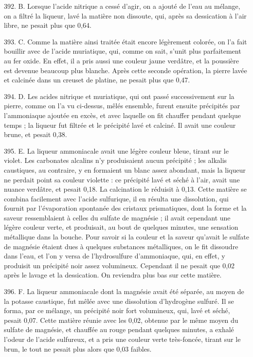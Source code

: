 \documentclass[a4paper, 11pt, oneside, polutonikogreek, french]{article}
\begin{document}
392. B. Lorsque l'acide nitrique a cessé d'agir, on a ajouté de l'eau au mélange, on a filtré la liqueur, lavé la matière non dissoute, qui, après sa dessication à l'air libre, ne pesait plus que 0,64.

393. C. Comme la matière ainsi traitée était encore légèrement colorée, on l'a fait bouillir avec de l'acide muriatique, qui, comme on sait, s'unit plus parfaitement au fer oxide. En effet, il a pris aussi une couleur jaune verdâtre, et la poussière est devenue beaucoup plus blanche. Après cette seconde opération, la pierre lavée et calcinée dans un creuset de platine, ne pesait plus que 0,47.

394. D. Les acides nitrique et muriatique, qui ont passé successivement sur la pierre, comme on l'a vu ci-dessus, mêlés ensemble, furent ensuite précipités par l'ammoniaque ajoutée en excès, et avec laquelle on fit chauffer pendant quelque temps ; la liqueur fut filtrée et le précipité lavé et calciné. Il avait une couleur brune, et pesait 0,38.

395. E. La liqueur ammoniacale avait une légère couleur bleue, tirant sur le violet. Les carbonates alcalins n'y produisaient aucun précipité ; les alkalis caustiques, au contraire, y en formaient un blanc assez abondant, mais la liqueur ne perdait point sa couleur violette : ce précipité lavé et séché à l'air, avait une nuance verdâtre, et pesait 0,18. La calcination le réduisit à 0,13. Cette matière se combina facilement avec l'acide sulfurique, il en résulta une dissolution, qui fournit par l'évaporation spontanée des cristaux prismatiques, dont la forme et la saveur ressemblaient à celles du sulfate de magnésie ; il avait cependant une légère couleur verte, et produisait, au bout de quelques minutes, une sensation métallique dans la bouche. Pour savoir si la couleur et la saveur qu'avait le sulfate de magnésie étaient dues à quelques substances métalliques, on le fit dissoudre dans l'eau, et l'on y versa de l'hydrosulfure d'ammoniaque, qui, en effet, y produisit un précipité noir assez volumineux. Cependant il ne pesait que 0,02 après le lavage et la dessication. On reviendra plus bas sur cette matière.

396. F. La liqueur ammoniacale dont la magnésie avait été séparée, au moyen de la potasse caustique, fut mêlée avec une dissolution d'hydrogène sulfuré. Il se forma, par ce mélange, un précipité noir fort volumineux, qui, lavé et séché, pesait 0,07. Cette matière réunie avec les 0,02, obtenue par le même moyen du sulfate de magnésie, et chauffée au rouge pendant quelques minutes, a exhalé l'odeur de l'acide sulfureux, et a pris une couleur verte très-foncée, tirant sur le brun, le tout ne pesait plus alors que 0,03 faibles.
\end{document}
